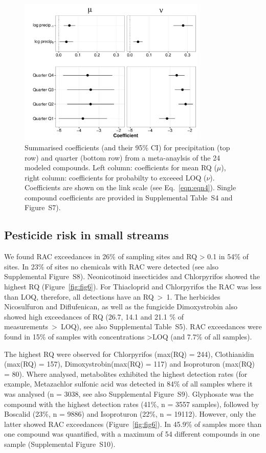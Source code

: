 \documentclass[journal=esthag,manuscript=article]{achemso}
\begin{document}
\begin{figure}[ht]
  \includegraphics[width=0.8\textwidth]{figure5.pdf}
  \caption{Summarised coefficients (and their 95\% CI) for precipitation (top row) and quarter (bottom row) from a meta-anaylsis of the 24 modeled compounds. Left column: coefficients for mean RQ ($\mu$), right column: coefficients for probabilty to exceeed LOQ ($\nu$). 
  Coefficients are shown on the link scale (see Eq.~\ref{eqn:eqn4}).
  Single compound coefficients are provided in Supplemental Table~S4 and Figure~S7).
  }
  \label{fig:fig5}
\end{figure}



\subsection{Pesticide risk in small streams}
We found RAC exceedances in 26\% of sampling sites and RQ > 0.1 in 54\% of sites. 
In 23\% of sites no chemicals with RAC were detected (see also Supplemental Figure~S8).
Neonicotinoid insecticides and Chlorpyrifos showed the highest RQ (Figure~\ref{fig:fig6}). %
For Thiacloprid and Chlorpyrifos the RAC was less than LOQ, therefore, all detections have an RQ~\textgreater~1. 
The herbicides Nicosulfuron and Diflufenican, as well as the fungicide Dimoxystrobin also showed high exceedances of RQ (26.7, 14.1 and 21.1 \% of measurements~\textgreater~LOQ), see also Supplemental Table~S5).
RAC exceedances were found in 15\% of samples with concentrations \textgreater LOQ (and 7.7\% of all samples).

The highest RQ were observed for Chlorpyrifos (max(RQ) = 244), Clothianidin (max(RQ) = 157), Dimoxystrobin(max(RQ) = 117) and Isoproturon (max(RQ) = 80). 
Where analysed, metabolites exhibited the highest detection rates (for example, Metazachlor sulfonic acid was detected in 84\% of all samples where it was analysed (n = 3038, see also Supplemental Figure~S9).
Glyphosate was the compound with the highest detection rates (41\%, n = 3557 samples), followed by Boscalid (23\%, n = 9886) and Isoproturon (22\%, n = 19112). 
However, only the latter showed RAC exceedances (Figure~\ref{fig:fig6}).
In 45.9\% of samples more than one compound was quantified, with a maximum of 54 different compounds in one sample (Supplemental Figure~S10). 
\end{document}
